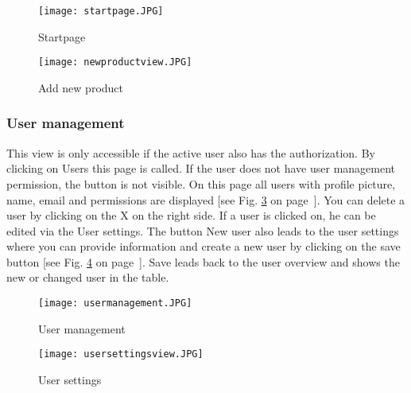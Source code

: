     \begin{figure}[h]
        \centering
        \texttt{[image: startpage.JPG]}
        \caption{Startpage}
        \label{fig: startpage}
    \end{figure}

    \begin{figure}[h]
        \centering
        \texttt{[image: newproductview.JPG]}
        \caption{Add new product}
        \label{fig: newproductview}
    \end{figure}



    \subsubsection*{User management}
    This view is only accessible if the active user also has the authorization. By clicking on Users this page is called. If the user does not have user management permission, the button is not visible. On this page all users with profile picture, name, email and permissions are displayed [see Fig. \ref{fig: usermanagement} on page~\pageref{fig: usermanagement}]. You can delete a user by clicking on the X on the right side. If a user is clicked on, he can be edited via the User settings. The button New user also leads to the user settings where you can provide information and create a new user by clicking on the save button [see Fig. \ref{fig: usersettingsview} on page~\pageref{fig: usersettingsview}]. Save leads back to the user overview and shows the new or changed user in the table.
    
    \begin{figure}[h]
        \centering
        \texttt{[image: usermanagement.JPG]}
        \caption{User management}
        \label{fig: usermanagement}
    \end{figure}


    \begin{figure}[h]
        \centering
        \texttt{[image: usersettingsview.JPG]}
        \caption{User settings}
        \label{fig: usersettingsview}
    \end{figure}


